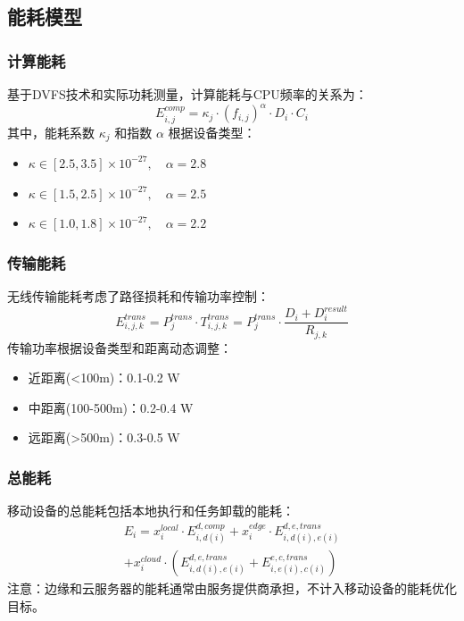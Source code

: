 \documentclass[conference]{IEEEtran}
\begin{document}
\subsection{能耗模型}
\subsubsection{计算能耗}
基于DVFS技术和实际功耗测量，计算能耗与CPU频率的关系为：
\begin{equation}
E_{i,j}^{comp} = \kappa_j \cdot (f_{i,j})^{\alpha} \cdot D_i \cdot C_i
\end{equation}
其中，能耗系数 $\mathcal{}\kappa_j$ 和指数 $\mathcal{}\alpha$ 根据设备类型：
\begin{itemize}
    \item $\mathcal{}\kappa \in [2.5, 3.5] \times 10^{-27}, \quad \alpha = 2.8$
    \item $\mathcal{}\kappa \in [1.5, 2.5] \times 10^{-27}, \quad \alpha = 2.5$
    \item $\mathcal{}\kappa \in [1.0, 1.8] \times 10^{-27}, \quad \alpha = 2.2$
\end{itemize}

\subsubsection{传输能耗}
无线传输能耗考虑了路径损耗和传输功率控制：
\begin{equation}
E_{i,j,k}^{trans} = P_j^{trans} \cdot T_{i,j,k}^{trans} = P_j^{trans} \cdot \frac{D_i + D_i^{result}}{R_{j,k}}
\end{equation}
传输功率根据设备类型和距离动态调整：
\begin{itemize}
    \item 近距离(<100m)：0.1-0.2 W
    \item 中距离(100-500m)：0.2-0.4 W
    \item 远距离(>500m)：0.3-0.5 W
\end{itemize}
\subsubsection{总能耗}
移动设备的总能耗包括本地执行和任务卸载的能耗：
\begin{equation}
\begin{split}
    E_i = x_{i}^{local} \cdot E_{i,d(i)}^{d,comp} + x_{i}^{edge} \cdot E_{i,d(i),e(i)}^{d,e,trans} \\
 + x_{i}^{cloud} \cdot (E_{i,d(i),e(i)}^{d,e,trans} + E_{i,e(i),c(i)}^{e,c,trans})
\end{split}
\end{equation}
注意：边缘和云服务器的能耗通常由服务提供商承担，不计入移动设备的能耗优化目标。
\end{document}
